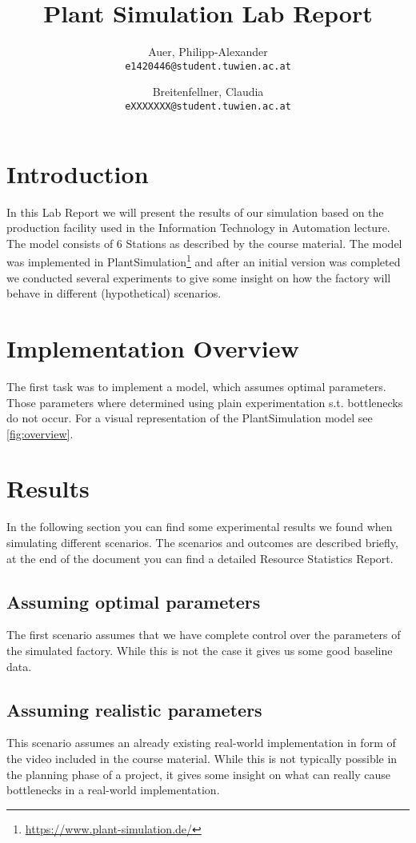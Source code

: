 \documentclass{report}
\begin{document}
\title{Plant Simulation Lab Report}
\author{
	Auer, Philipp-Alexander\\
	\texttt{e1420446@student.tuwien.ac.at}
	\and
	Breitenfellner, Claudia\\
	\texttt{eXXXXXXX@student.tuwien.ac.at}
}

\maketitle
\tableofcontents
\pagebreak
\section{Introduction}
In this Lab Report we will present the results of our simulation based on the production facility used in the Information Technology in Automation lecture. The model consists of 6 Stations as described by the course material. The model was implemented in PlantSimulation\footnote{\url{https://www.plant-simulation.de/}} and after an initial version was completed we conducted several experiments to give some insight on how the factory will behave in different (hypothetical) scenarios.

\section{Implementation Overview}
The first task was to implement a model, which assumes optimal parameters. Those parameters where determined using plain experimentation s.t. bottlenecks do not occur. For a visual representation of the PlantSimulation model see \ref{fig:overview}.

\section{Results}
In the following section you can find some experimental results we found when simulating different scenarios. The scenarios and outcomes are described briefly, at the end of the document you can find a detailed Resource Statistics Report. 
\subsection{Assuming optimal parameters}
The first scenario assumes that we have complete control over the parameters of the simulated factory. While this is not the case it gives us some good baseline data.
\subsection{Assuming realistic parameters}
This scenario assumes an already existing real-world implementation in form of the video included in the course material. While this is not typically possible in the planning phase of a project, it gives some insight on what can really cause bottlenecks in a real-world implementation. 
\end{document}
